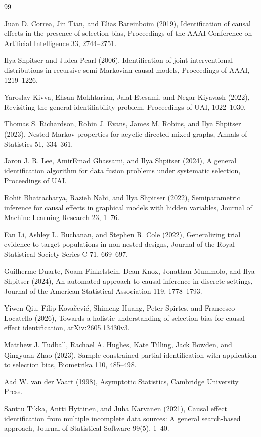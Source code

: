 \documentclass{article}
\begin{document}
\begin{thebibliography}{99}

   Juan D. Correa, Jin Tian, and Elias Bareinboim (2019), Identification of causal effects in the presence of selection bias, Proceedings of the AAAI Conference on Artificial Intelligence 33, 2744--2751.

   Ilya Shpitser and Judea Pearl (2006), Identification of joint interventional distributions in recursive semi-Markovian causal models, Proceedings of AAAI, 1219--1226.

   Yaroslav Kivva, Ehsan Mokhtarian, Jalal Etesami, and Negar Kiyavash (2022), Revisiting the general identifiability problem, Proceedings of UAI, 1022--1030.

   Thomas S. Richardson, Robin J. Evans, James M. Robins, and Ilya Shpitser (2023), Nested Markov properties for acyclic directed mixed graphs, Annals of Statistics 51, 334--361.

   Jaron J. R. Lee, AmirEmad Ghassami, and Ilya Shpitser (2024), A general identification algorithm for data fusion problems under systematic selection, Proceedings of UAI.

   Rohit Bhattacharya, Razieh Nabi, and Ilya Shpitser (2022), Semiparametric inference for causal effects in graphical models with hidden variables, Journal of Machine Learning Research 23, 1--76.

   Fan Li, Ashley L. Buchanan, and Stephen R. Cole (2022), Generalizing trial evidence to target populations in non-nested designs, Journal of the Royal Statistical Society Series C 71, 669--697.

   Guilherme Duarte, Noam Finkelstein, Dean Knox, Jonathan Mummolo, and Ilya Shpitser (2024), An automated approach to causal inference in discrete settings, Journal of the American Statistical Association 119, 1778--1793.

   Yiwen Qiu, Filip Kovačević, Shimeng Huang, Peter Spirtes, and Francesco Locatello (2026), Towards a holistic understanding of selection bias for causal effect identification, arXiv:2605.13430v3.

   Matthew J. Tudball, Rachael A. Hughes, Kate Tilling, Jack Bowden, and Qingyuan Zhao (2023), Sample-constrained partial identification with application to selection bias, Biometrika 110, 485--498.

   Aad W. van der Vaart (1998), Asymptotic Statistics, Cambridge University Press.

   Santtu Tikka, Antti Hyttinen, and Juha Karvanen (2021), Causal effect identification from multiple incomplete data sources: A general search-based approach, Journal of Statistical Software 99(5), 1--40.

\end{thebibliography}
\end{document}

